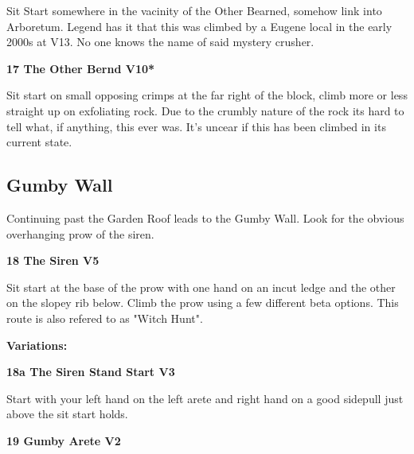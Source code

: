 \begin{multicols}{2}
\begin{adjustwidth}{0.5cm}{}
							\begin{adjustwidth}{0.5cm}{}				
							Sit Start somewhere in the vacinity of the Other Bearned, somehow link into Arboretum. Legend has it that this was climbed by a Eugene local in the early 2000s at V13. No one knows the name of said mystery crusher.
							\end{adjustwidth}
						\end{adjustwidth}
					\label{rt:The Other Bernd}
\colorbox{red!20}{
\parbox{0.95\linewidth}{
\textbf{
17 The Other Bernd V10*  
}
}
}

					\begin{adjustwidth}{0.5cm}{}				
					Sit start on small opposing crimps at the far right of the block, climb more or less straight up on exfoliating rock. Due to the crumbly nature of the rock its hard to tell what, if anything, this ever was. It's uncear if this has been climbed in its current state.
					\end{adjustwidth}
			\subsection*{Gumby Wall}\label{bf:Gumby Wall}
			Continuing past the Garden Roof leads to the Gumby Wall. Look for the obvious overhanging prow of the siren.\\
			
					\label{rt:The Siren}
\colorbox{RoyalBlue!20}{
\parbox{0.95\linewidth}{
\textbf{
18 The Siren V5  
}
}
}

					\begin{adjustwidth}{0.5cm}{}				
					Sit start at the base of the prow with one hand on an incut ledge and the other on the slopey rib below. Climb the prow using a few different beta options. This route is also refered to as "Witch Hunt".
					\end{adjustwidth}
						\begin{adjustwidth}{0.5cm}{}				
						\textbf{Variations:} \newline

							\label{vr:The Siren Stand Start}
\colorbox{green!20}{
\parbox{0.95\linewidth}{
\textbf{
18a The Siren Stand Start V3  
}
}
}

							\begin{adjustwidth}{0.5cm}{}				
							Start with your left hand on the left arete and right hand on a good sidepull just above the sit start holds.
							\end{adjustwidth}
						\end{adjustwidth}
					\label{rt:Gumby Arete}
\colorbox{green!20}{
\parbox{0.95\linewidth}{
\textbf{
19 Gumby Arete V2  
}
}
}


\end{multicols}
